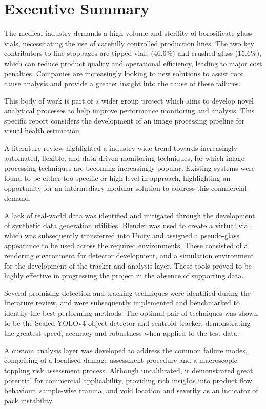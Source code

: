 \documentclass[10pt]{article}
\begin{document}
\clearpage

\section*{Executive Summary}
The medical industry demands a high volume and sterility of borosilicate glass vials, necessitating the use of carefully controlled production lines. The two key contributors to line stoppages are tipped vials (46.6\%) and crushed glass (15.6\%), which can reduce product quality and operational efficiency, leading to major cost penalties. Companies are increasingly looking to new solutions to assist root cause analysis and provide a greater insight into the cause of these failures. 

This body of work is part of a wider group project which aims to develop novel analytical processes to help improve performance monitoring and analysis. This specific report considers the development of an image processing pipeline for visual health estimation.

A literature review highlighted a industry-wide trend towards increasingly automated, flexible, and data-driven monitoring techniques, for which image processing techniques are becoming increasingly popular. Existing systems were found to be either too specific or high-level in approach, highlighting an opportunity for an intermediary modular solution to address this commercial demand. 

A lack of real-world data was identified and mitigated through the development of synthetic data generation utilities. Blender was used to create a virtual vial, which was subsequently transferred into Unity and assigned a pseudo-glass appearance to be used across the required environments. These consisted of a rendering environment for detector development, and a simulation environment for the development of the tracker and analysis layer. These tools proved to be highly effective in progressing the project in the absence of supporting data.

Several promising detection and tracking techniques were identified during the literature review, and were subsequently implemented and benchmarked to identify the best-performing methods. The optimal pair of techniques was shown to be the Scaled-YOLOv4 object detector and centroid tracker, demonstrating the greatest speed, accuracy and robustness when applied to the test data.

A custom analysis layer was developed to address the common failure modes,  comprising of a localised damage assessment procedure and a macroscopic toppling risk assessment process. Although uncalibrated, it demonstrated great potential for commercial applicability, providing rich insights into product flow behaviour, sample-wise trauma, and void location and severity as an indicator of pack instability.
\end{document}
